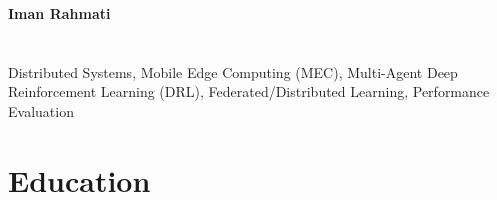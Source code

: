 \documentclass[11pt]{article}
\def\today{\number\day \space \ifcase\month\or
	Jan\or Feb\or Mar\or Apr\or May\or Jun\or
	Jul\or Aug\or Sep\or Oct\or Nov\or Dec\fi
	\space \number\year}
\begin{document}
	

	
%         
{\noindent \huge\bfseries Iman Rahmati}\hfill%
\vspace{-1cm}
\section{}
 \vspace{-2mm}

 Distributed Systems, Mobile Edge Computing (MEC), Multi-Agent Deep Reinforcement Learning (DRL), Federated/Distributed Learning, Performance Evaluation
\vspace{-3mm}
\section{Education}
\end{document}
